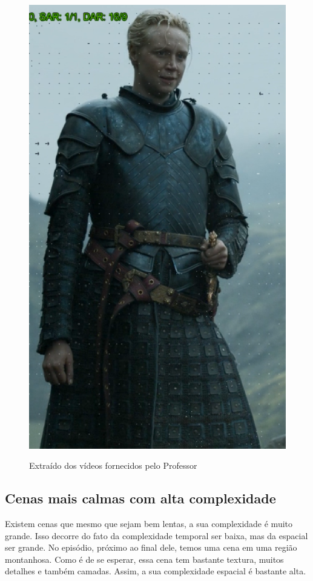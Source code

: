 \begin{figure}[H]
    \includegraphics[scale=0.3]{Documeto/1-ElementosTextuais/images/23.png}

    \small
    Extraído dos vídeos fornecidos pelo Professor
\end{figure}

\subsection{Cenas mais calmas com alta complexidade}
Existem cenas que mesmo que sejam bem lentas, a sua complexidade é muito grande. Isso decorre do fato da complexidade temporal ser baixa, mas da espacial ser grande. No episódio, próximo ao final dele, temos uma cena em uma região montanhosa. Como é de se esperar, essa cena tem bastante textura, muitos detalhes e também camadas. Assim, a sua complexidade espacial é bastante alta.


